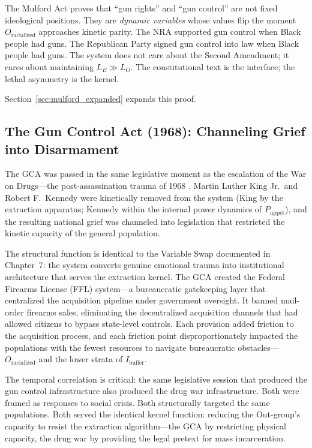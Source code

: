 \documentclass[12pt,openany]{book}
\begin{document}
The Mulford Act proves that ``gun rights'' and ``gun control'' are not fixed ideological positions. They are \textit{dynamic variables} whose values flip the moment $O_{\text{racialized}}$ approaches kinetic parity. The NRA supported gun control when Black people had guns. The Republican Party signed gun control into law when Black people had guns. The system does not care about the Second Amendment; it cares about maintaining $L_E \gg L_O$. The constitutional text is the interface; the lethal asymmetry is the kernel.

Section~\ref{sec:mulford_expanded} expands this proof.

\subsection{The Gun Control Act (1968): Channeling Grief into Disarmament}

The GCA was passed in the same legislative moment as the escalation of the War on Drugs---the post-assassination trauma of 1968 \cite{gca1968}. Martin Luther King Jr.\ and Robert F.\ Kennedy were kinetically removed from the system (King by the extraction apparatus; Kennedy within the internal power dynamics of $P_{\text{uppet}}$), and the resulting national grief was channeled into legislation that restricted the kinetic capacity of the general population.

The structural function is identical to the Variable Swap documented in Chapter~7: the system converts genuine emotional trauma into institutional architecture that serves the extraction kernel. The GCA created the Federal Firearms License (FFL) system---a bureaucratic gatekeeping layer that centralized the acquisition pipeline under government oversight. It banned mail-order firearms sales, eliminating the decentralized acquisition channels that had allowed citizens to bypass state-level controls. Each provision added friction to the acquisition process, and each friction point disproportionately impacted the populations with the fewest resources to navigate bureaucratic obstacles---$O_{\text{racialized}}$ and the lower strata of $I_{\text{buffer}}$.

The temporal correlation is critical: the same legislative session that produced the gun control infrastructure also produced the drug war infrastructure. Both were framed as responses to social crisis. Both structurally targeted the same populations. Both served the identical kernel function: reducing the Out-group's capacity to resist the extraction algorithm---the GCA by restricting physical capacity, the drug war by providing the legal pretext for mass incarceration.
\end{document}
